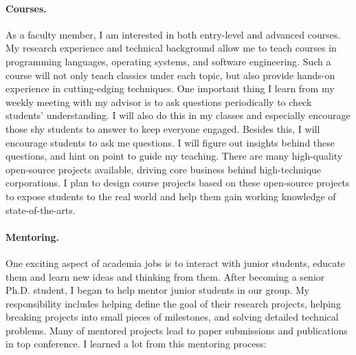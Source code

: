 \documentclass[10pt]{article}
\begin{document}
\paragraph*{Courses.} As a faculty member, I am interested in both entry-level and advanced courses. 
My research experience and technical background allow me to teach courses in programming languages, operating systems, and software engineering.
Such a course will not only teach classics under each topic, but also provide hands-on experience in cutting-edging techniques.
One important thing I learn from my weekly meeting with my advisor is to ask questions periodically to check students' understanding.
I will also do this in my classes and especially encourage those shy students to answer to keep everyone engaged. 
Besides this, I will encourage students to ask me questions. 
I will figure out insights behind these questions, and hint on point to guide my teaching. 
There are many high-quality open-source projects available, 
driving core business behind high-technique corporations. 
I plan to design course projects based on these open-source projects 
to expose students to the real world and help them gain working knowledge of state-of-the-arts. 

\vspace{0.15in}
\paragraph*{Mentoring.}One exciting aspect of academia jobs is to interact with junior students, 
educate them and learn new ideas and thinking from them. 
After becoming a senior Ph.D. student, I began to help mentor junior students in our group. 
My responsibility includes helping define the goal of their research projects, 
helping breaking projects into small pieces of milestones, 
and solving detailed technical problems. 
Many of mentored projects lead to paper submissions and publications in top conference. 
I learned a lot from this mentoring process: 

%
%
\end{document}
